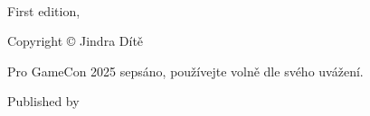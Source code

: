 {\small
\setlength{\parindent}{0em}\setlength{\parskip}{1em}
~
\vfill

First edition, \editionyear{}

Copyright \copyright{} \editionyear{} Jindra Dítě

{Pro GameCon 2025 sepsáno, používejte volně dle svého uvážení.}


\ifx\isbn\undefined\else\if\relax\detokenize\expandafter{\isbn}\relax{}\fi\fi


Published by \publisher{}
}
